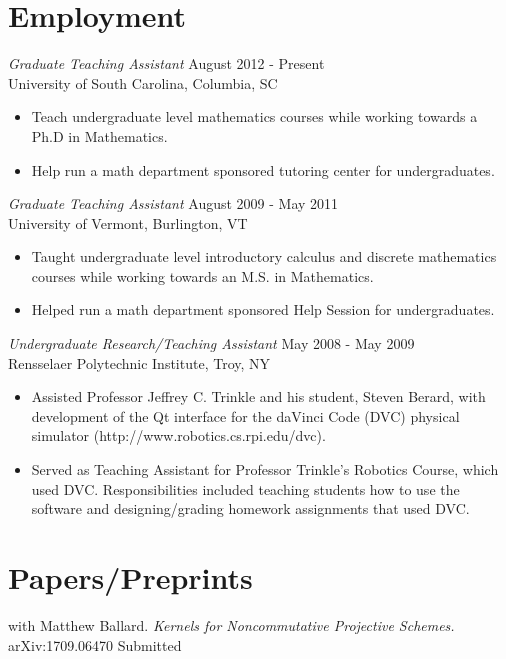 \documentclass{article}
\begin{document}
  \section*{Employment}
  \textsl{Graduate Teaching Assistant} \hfill August 2012 - Present \\
  University of South Carolina, Columbia, SC
  \begin{itemize}  \itemsep -2pt %
  \item
    Teach undergraduate level mathematics courses while working towards a Ph.D in Mathematics.
  \item 
    Help run a math department sponsored tutoring center for undergraduates.
  \end{itemize}
  
  \noindent\textsl{Graduate Teaching Assistant} \hfill August 2009 - May 2011 \\
  University of Vermont, Burlington, VT
  \begin{itemize}  \itemsep -2pt %
  \item
    Taught undergraduate level introductory calculus and discrete mathematics courses while working towards an M.S. in Mathematics.
  \item 
    Helped run a math department sponsored Help Session for undergraduates.
  \end{itemize}
  \newpage
  \noindent\textsl{Undergraduate Research/Teaching Assistant} \hfill May 2008 - May 2009 \\
  Rensselaer Polytechnic Institute, Troy, NY
  \begin{itemize}  \itemsep -2pt %
  \item Assisted Professor Jeffrey C. Trinkle and his student, Steven Berard, with development of the Qt interface for the daVinci Code (DVC) physical simulator (http://www.robotics.cs.rpi.edu/dvc).
  \item Served as Teaching Assistant for Professor Trinkle's Robotics Course, which used DVC.
    Responsibilities included teaching students how to use the software and designing/grading homework assignments that used DVC.
  \end{itemize}

  \section*{Papers/Preprints}
  with Matthew Ballard.  \textsl{Kernels for Noncommutative Projective Schemes.} 
  arXiv:1709.06470 \hfill Submitted
\end{document}
